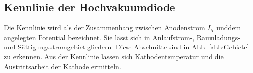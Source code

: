 \subsection{Kennlinie der Hochvakuumdiode}

Die Kennlinie wird als der Zusammenhang zwischen Anodenstrom $I_\text{A}$ unddem angelegten Potential bezeichnet. 
Sie lässt sich in Anlaufstrom-, Raumladungs- und Sättigungsstromgebiet gliedern. 
Diese Abschnitte sind in Abb. \ref{abb:Gebiete} zu erkennen. Aus der Kennlinie lassen sich Kathodentemperatur und die Austrittsarbeit der Kathode ermitteln. 


